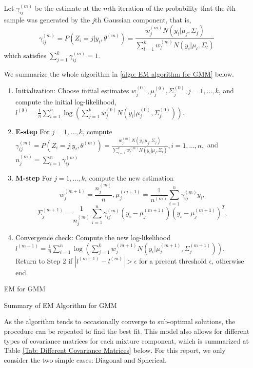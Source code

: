 Let $\gamma_{ij}^{(m)}$ be the estimate at the $m$th iteration of the probability that the $i$th sample was generated by the $j$th Gaussian component, that is, 
\begin{equation*}
\gamma_{ij}^{(m)} = P(Z_i=j|y_i, \theta^{(m)}) = \frac{w_j^{(m)}N(y_i|\mu_j, \Sigma_j)}{\sum_{l=1}^kw_l^{(m)}N(y_i|\mu_l, \Sigma_l)}
\end{equation*}
which satisfies $\sum_{j=1}^k \gamma_{ij}^{(m)}=1.$

We summarize the whole algorithm in \autoref{algo: EM algorithm for GMM} below.
\begin{table}[H]
	{\LinesNumberedHidden
		\begin{algorithm}[H]
			\begin{enumerate}
				\item Initialization: Choose initial estimates $w_j^{(0)}, \mu_j^{(0)}, \Sigma_j^{(0)}, j =1, \dots, k$, and compute the initial log-likelihood,
				$l^{(0)} = \frac{1}{n}\sum_{i=1}^n \log(\sum_{j=1}^kw_j^{(0)}N(y_i|\mu_j^{(0)},\Sigma_j^{(0)})).$
				\item \textbf{E-step} For $j = 1,\dots,k$, compute
				$\gamma_{ij}^{(m)} = P(Z_i=j|y_i, \theta^{(m)}) = \frac{w_j^{(m)}N(y_i|\mu_j, \Sigma_j)}{\sum_{l=1}^kw_l^{(m)}N(y_i|\mu_l, \Sigma_l)}, i = 1, \dots, n, $
				and $n_j^{(m)} = \sum_{i=1}^n \gamma_{ij}^{(m)}$
				\item \textbf{M-step} For $j = 1,\dots, k$, compute the new estimation
				$$w_j^{(m+1)} = \frac{n_j^{(m)}}{n}, \mu_j^{(m+1)} = \frac{1}{n^{(m)}}\sum_{i=1}^n\gamma_{ij}^{(m)}y_i,$$
				$$\Sigma_j^{(m+1)} = \frac{1}{n_j^{(m)}}\sum_{i=1}^n \gamma_{ij}^{(m)}(y_i-\mu_j^{(m+1)})(y_i-\mu_j^{(m+1)})^T,$$
				\item Convergence check: Compute the new log-likelihood $l^{(m+1)} = \frac{1}{n}\sum_{i=1}^n \log(\sum_{j=1}^kw_j^{(m+1)}N(y_i|\mu_j^{(m+1)}, \Sigma_j^{(m+1)}))$. \\
				Return to Step 2 if $|l^{(m+1)}-l^{(m)}| > \epsilon$ for a present threshold $\epsilon$, otherwise end.
			\end{enumerate}
			\caption{EM for GMM}
	\end{algorithm}}
	\caption{Summary of EM Algorithm for GMM}
	\label{algo: EM algorithm for GMM}
\end{table}
As the algorithm tends to occasionally converge to sub-optimal solutions, the procedure can be repeated to find the best fit. This model also allows for different types of covariance matrices for each mixture component, which is summarized at Table \ref{Tab: Different Covariance Matrices} below. For this report, we only consider the two simple cases: Diagonal and Spherical.
